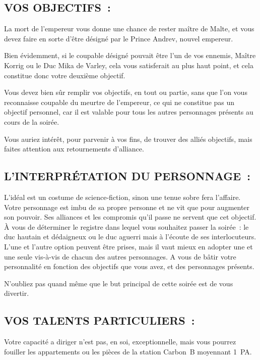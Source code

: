 \documentclass[14pt,twocolumn]{extarticle}
\begin{document}
\subsection{VOS OBJECTIFS~:}

La mort de l'empereur vous donne une chance de rester maître de Malte, et vous
devez faire en sorte d'être désigné par le Prince Andrev, nouvel empereur.

Bien évidemment, si le coupable désigné pouvait être l'un de vos ennemis,
Maître Korrig ou le Duc Mika de Varley, cela vous satisferait au plus haut
point, et cela constitue donc votre deuxième objectif.

Vous devez bien sûr remplir vos objectifs, en tout ou partie, sans que l'on
vous reconnaisse coupable du meurtre de l'empereur, ce qui ne constitue pas un
objectif personnel, car il est valable pour tous les autres personnages
présents au cours de la soirée.

Vous auriez intérêt, pour parvenir à vos fins, de trouver des alliés objectifs,
mais faites attention aux retournements d'alliance.

\subsection{L'INTERPRÉTATION DU PERSONNAGE~:}

L'idéal est un costume de science-fiction, sinon une tenue sobre fera
l'affaire. Votre personnage est imbu de sa propre personne et ne vit que pour
augmenter son pouvoir. Ses alliances et les compromis qu'il passe ne servent
que cet objectif. À vous de déterminer le registre dans lequel vous souhaitez
passer la soirée~: le duc hautain et dédaigneux ou le duc aguerri mais à
l'écoute de ses interlocuteurs. L'une et l'autre option peuvent être prises,
mais il vaut mieux en adopter une et une seule vis-à-vis de chacun des autres
personnages. A vous de bâtir votre personnalité en fonction des objectifs que
vous avez, et des personnages présents.

N'oubliez pas quand même que le but principal de cette soirée est de vous
divertir.

\subsection{VOS TALENTS PARTICULIERS~:}

Votre capacité a diriger n'est pas, en soi, exceptionnelle, mais vous pourrez
fouiller les appartements ou les pièces de la station Carbon~B moyennant 1~PA.
\end{document}
